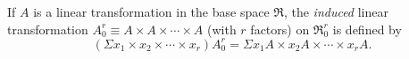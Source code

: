 If $A$ is a linear transformation in the base space $\Re$, the \textit{induced} linear transformation $A_0^r \equiv A \times A \times \cdots \times A$ (with $r$ factors) on $\Re_0^r$ is defined by
$$(\Sigma x_1 \times x_2 \times \cdots \times x_r) A_0^r = \Sigma x_1 A \times x_2 A \times \cdots \times x_r A.$$

